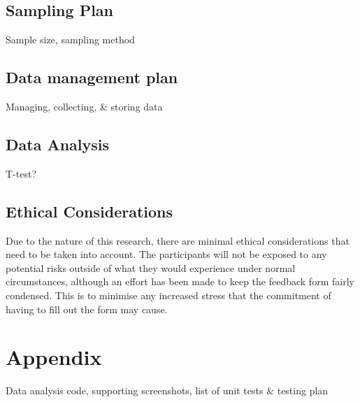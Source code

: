 \documentclass[lettersize,journal]{IEEEtran}
\begin{document}
    \subsection{Sampling Plan}
        Sample size, sampling method
    
    \subsection{Data management plan}
        
        Managing, collecting, \& storing data
    
    \subsection{Data Analysis}
        T-test?

    \subsection{Ethical Considerations}
        Due to the nature of this research, there are minimal ethical considerations that need to be taken into account. The participants will not be exposed to any potential risks outside of what they would experience under normal circumstances, although an effort has been made to keep the feedback form fairly condensed. This is to minimise any increased stress that the commitment of having to fill out the form may cause.
    
    \section{Appendix}
    Data analysis code, supporting screenshots, list of unit tests \& testing plan







\end{document}
